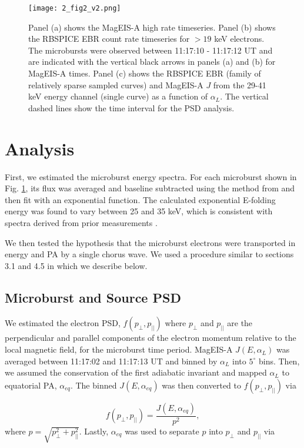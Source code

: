 \begin{figure}
\texttt{[image: 2\_fig2\_v2.png]}
\caption{Panel (a) shows the MagEIS-A high rate timeseries. Panel (b) shows the RBSPICE EBR count rate timeseries for $> 19$ keV electrons. The microbursts were observed between 11:17:10 - 11:17:12 UT and are indicated with the vertical black arrows in panels (a) and (b) for MagEIS-A times. Panel (c) shows the RBSPICE EBR (family of relatively sparse sampled curves) and MagEIS-A $J$ from the 29-41 keV energy channel (single curve) as a function of $\alpha_{L}$. The vertical dashed lines show the time interval for the PSD analysis.}
\label{fig2}
\end{figure}

\section{Analysis} \label{analysis} %
First, we estimated the microburst energy spectra. For each microburst shown in Fig. \ref{fig2}, its flux was averaged and baseline subtracted using the method from \citet{O'Brien2004} and then fit with an exponential function. The calculated exponential E-folding energy was found to vary between 25 and 35 keV, which is consistent with spectra derived from prior measurements \citep{Datta1997, Lee2005, Lee2012}.

We then tested the hypothesis that the microburst electrons were transported in energy and PA by a single chorus wave. We used a procedure similar to sections 3.1 and 4.5 in \citet{Meredith2002} which we describe below.

\subsection{Microburst and Source PSD} \label{psd_sec}
We estimated the electron PSD, $f(p_\perp, p_{||})$ where $p_\perp$ and $p_{||}$ are the perpendicular and parallel components of the electron momentum relative to the local magnetic field, for the microburst time period. MagEIS-A $J(E, \alpha_{L})$ was averaged between 11:17:02 and 11:17:13 UT and binned by $\alpha_{L}$ into $5^\circ$ bins. Then, we assumed the conservation of the first adiabatic invariant and mapped $\alpha_{L}$ to equatorial PA, $\alpha_{eq}$. The binned $J(E, \alpha_{eq})$ was then converted to $f(p_\perp, p_{||})$ via

\begin{equation}
f(p_\perp, p_{||}) = \frac{J(E, \alpha_{eq})}{p^2},
\label{psd_eq}
\end{equation} where $p = \sqrt{p_\perp^2 + p_{||}^2}$. Lastly, $\alpha_{eq}$ was used to separate $p$ into $p_\perp$ and $p_{||}$ via

